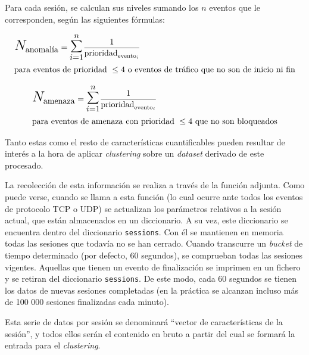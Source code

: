Para cada sesión, se calculan sus niveles sumando los \(n\) eventos que le corresponden, según las siguientes fórmulas:

\begin{eqnarray*}
    & \mathlarger{\mathlarger{\mathlarger{N}}}_{\textrm{anomalía}} = \mathlarger{\mathlarger{\mathlarger{\sum}}}_{i=1}^{n} \frac{1}{\textrm{prioridad}_{\textrm{evento}_i}}\\
    & \textrm{para eventos de prioridad }\leq4\textrm{ o eventos de tráfico que no son de inicio ni fin}
\end{eqnarray*}

\begin{eqnarray*}
    & \mathlarger{\mathlarger{\mathlarger{N}}}_{\textrm{amenaza}} = \mathlarger{\mathlarger{\mathlarger{\sum}}}_{i=1}^{n} \frac{1}{\textrm{prioridad}_{\textrm{evento}_i}}\\
    & \textrm{para eventos de amenaza con prioridad }\leq4\textrm{ que no son bloqueados}
\end{eqnarray*}

Tanto estas como el resto de características cuantificables pueden resultar de interés a la hora de aplicar \emph{clustering} sobre un \emph{dataset} derivado de este procesado.

La recolección de esta información se realiza a través de la función adjunta.
Como puede verse, cuando se llama a esta función (lo cual ocurre ante todos los eventos de protocolo TCP o UDP)
se actualizan los parámetros relativos a la sesión actual, que están almacenados en un diccionario.
A su vez, este diccionario se encuentra dentro del diccionario \texttt{sessions}.
Con él se mantienen en memoria todas las sesiones que todavía no se han cerrado.
Cuando transcurre un \emph{bucket} de tiempo determinado (por defecto, 60 segundos), se comprueban todas las sesiones vigentes.
Aquellas que tienen un evento de finalización se imprimen en un fichero y se retiran del diccionario \texttt{sessions}.
De este modo, cada 60 segundos se tienen los datos de nuevas sesiones completadas (en la práctica se alcanzan incluso más de 100 000 sesiones finalizadas cada minuto).

Esta serie de datos por sesión se denominará ``vector de características de la sesión'', y todos ellos serán el contenido en bruto a partir del cual se formará la entrada para el \emph{clustering}.

